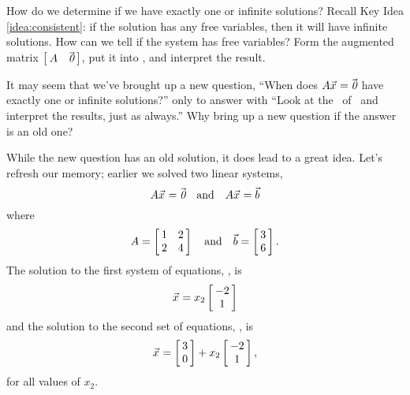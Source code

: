 
How do we determine if we have exactly one or infinite solutions? Recall Key Idea \ref{idea:consistent}: if the solution has any free variables, then it will have infinite solutions. How can we tell if the system has free variables? Form the augmented matrix $\bmx{cc} \tta & \zero \emx$, put it into \rref, and interpret the result. 


%
%
%

It may seem that we've brought up a new question, ``When does $\tta\vx=\zero$ have exactly one or infinite solutions?'' only to answer with ``Look at the \rref\ of \tta\ and interpret the results, just as always.'' Why bring up a new question if the answer is an old one?

While the new question has an old solution, it does lead to a great idea. Let's refresh our memory; earlier we solved two linear systems, $$\tta\vx = \zero \quad \text{and} \quad \tta\vx = \vb$$ where $$\tta = \bmx{cc}1&2\\2&4\emx \quad \text{and} \quad \vb = \bmx{c}3\\6\emx.$$ The solution to the first system of equations, \ttaxo, is $$\vx = x_2\bmx{c}-2\\1\emx$$  and the solution to the second set of equations, \ttaxb, is $$\vx = \bmx{c}3\\0\emx + x_2\bmx{c}-2\\1\emx,$$ for all values of $x_2$.

